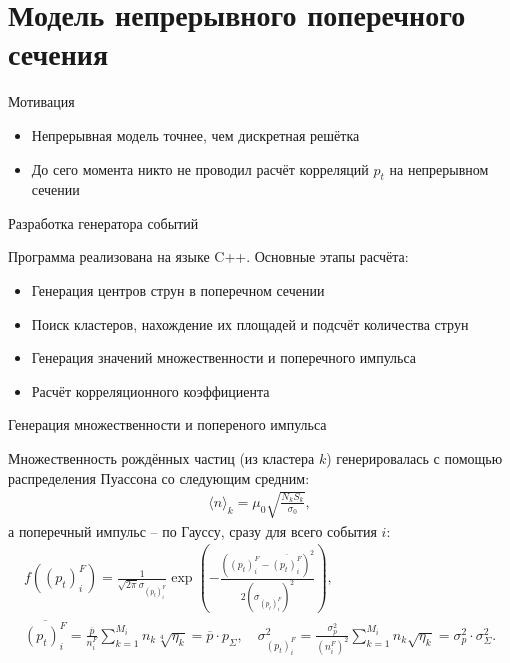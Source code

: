 \documentclass[aspectratio=43]{beamer}
\begin{document}
\section{Модель непрерывного поперечного сечения}

\begin{frame}{Мотивация}
	
	\Large{
	\begin{itemize}[<+- | alert@+>]
		\item Непрерывная модель точнее, чем дискретная решётка
		\item До сего момента никто не проводил расчёт корреляций $p_t$ на непрерывном сечении
	\end{itemize}
	}

\end{frame}

\begin{frame}{Разработка генератора событий}

	Программа реализована на языке C++. Основные этапы расчёта:
	\begin{itemize}[<+- | alert@+>]
		\item Генерация центров струн в поперечном сечении
		\item Поиск кластеров, нахождение их площадей и подсчёт количества струн 
		\item Генерация значений множественности и поперечного импульса
		\item Расчёт корреляционного коэффициента
	\end{itemize}

\end{frame}

\begin{frame}{Генерация множественности и попереного импульса}

	Множественность рождённых частиц (из кластера $k$) генерировалась с помощью распределения Пуассона со следующим средним:
	\begin{align*}
		\langle n \rangle_k = \mu_0 \sqrt{\frac{N_k S_k}{\sigma_0}},
	\end{align*}
	а поперечный импульс -- по Гауссу, сразу для всего события $i$:
	\begin{align*}
		f((p_t)_i^F) = \frac{1}{\sqrt{2\pi} \sigma_{(p_t)_i^F}} \exp{\left( - \frac{((p_t)_i^F - \overline{(p_t)_i^F})^2}{2(\sigma_{(p_t)_i^F})^2} \right)}, \qquad \qquad \quad \\
		\overline{(p_t)_i^F} = \frac{\overline{p}}{n_i^F} \sum_{k = 1}^{M_i} n_k \sqrt[4]{\eta_k} = \overline{p} \cdot p_\Sigma, \quad 
		\sigma_{(p_t)_i^F}^2 = \frac{\sigma_p^2}{(n_i^F)^2} \sum_{k = 1}^{M_i} n_k \sqrt{\eta_k} = \sigma_p^2 \cdot \sigma_\Sigma^2.
	\end{align*}

\end{frame}
\end{document}
